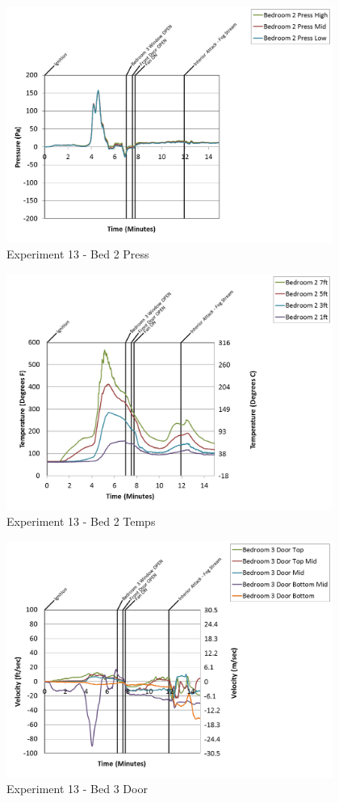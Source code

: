 \documentclass{article}
\begin{document}
\begin{appendices}
\begin{figure}[h!]
	\centering
	\includegraphics[height=3.05in]{0_Images/Results_Charts/Exp_13_Charts/Bed2Press.png}
	\caption{Experiment 13 - Bed 2 Press}
\end{figure}

\clearpage

\begin{figure}[h!]
	\centering
	\includegraphics[height=3.05in]{0_Images/Results_Charts/Exp_13_Charts/Bed2Temps.png}
	\caption{Experiment 13 - Bed 2 Temps}
\end{figure}


\begin{figure}[h!]
	\centering
	\includegraphics[height=3.05in]{0_Images/Results_Charts/Exp_13_Charts/Bed3Door.png}
	\caption{Experiment 13 - Bed 3 Door}
\end{figure}


\end{appendices}
\end{document}
